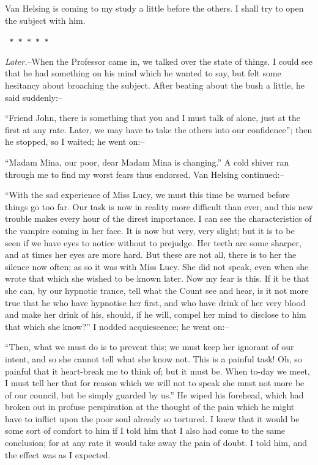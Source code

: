 \documentclass[12pt,openright]{book}
\begin{document}
Van Helsing is coming to my study a little before the others. I shall try to open the subject with him.

\texttt{   *       *       *       *       *}

\textit{Later.}–When the Professor came in, we talked over the state of things. I could see that he had something on his mind which he wanted to say, but felt some hesitancy about broaching the subject. After beating about the bush a little, he said suddenly:–

“Friend John, there is something that you and I must talk of alone, just at the first at any rate. Later, we may have to take the others into our confidence”; then he stopped, so I waited; he went on:–

“Madam Mina, our poor, dear Madam Mina is changing.” A cold shiver ran through me to find my worst fears thus endorsed. Van Helsing continued:–

“With the sad experience of Miss Lucy, we must this time be warned before things go too far. Our task is now in reality more difficult than ever, and this new trouble makes every hour of the direst importance. I can see the characteristics of the vampire coming in her face. It is now but very, very slight; but it is to be seen if we have eyes to notice without to prejudge. Her teeth are some sharper, and at times her eyes are more hard. But these are not all, there is to her the silence now often; as so it was with Miss Lucy. She did not speak, even when she wrote that which she wished to be known later. Now my fear is this. If it be that she can, by our hypnotic trance, tell what the Count see and hear, is it not more true that he who have hypnotise her first, and who have drink of her very blood and make her drink of his, should, if he will, compel her mind to disclose to him that which she know?” I nodded acquiescence; he went on:–

“Then, what we must do is to prevent this; we must keep her ignorant of our intent, and so she cannot tell what she know not. This is a painful task! Oh, so painful that it heart-break me to think of; but it must be. When to-day we meet, I must tell her that for reason which we will not to speak she must not more be of our council, but be simply guarded by us.” He wiped his forehead, which had broken out in profuse perspiration at the thought of the pain which he might have to inflict upon the poor soul already so tortured. I knew that it would be some sort of comfort to him if I told him that I also had come to the same conclusion; for at any rate it would take away the pain of doubt. I told him, and the effect was as I expected.
\end{document}

